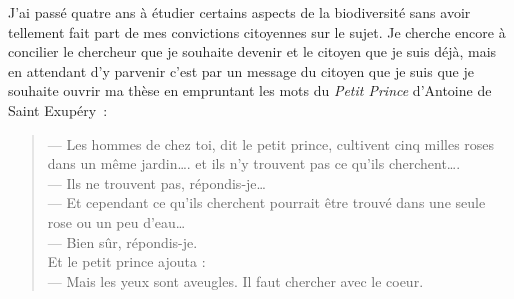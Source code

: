 J'ai passé quatre ans à étudier certains aspects de la biodiversité sans
avoir tellement fait part de mes convictions citoyennes sur le sujet. Je
cherche encore à concilier le chercheur que je souhaite devenir et le
citoyen que je suis déjà, mais en attendant d'y parvenir c'est par un
message du citoyen que je suis que je souhaite ouvrir ma thèse en
empruntant les mots du \textit{Petit Prince} d'Antoine de Saint
Exupéry~:

\begin{quote}
--- Les hommes de chez toi, dit le petit prince, cultivent cinq milles
roses dans un même jardin\ldots{}. et ils n'y trouvent pas ce qu'ils
cherchent\ldots{}.\\
--- Ils ne trouvent pas, répondis-je\ldots{}\\
--- Et cependant ce qu'ils cherchent pourrait être trouvé dans une seule
rose ou un peu d'eau\ldots{}\\
--- Bien sûr, répondis-je.\\
Et le petit prince ajouta :\\
--- Mais les yeux sont aveugles. Il faut chercher avec le coeur.
\end{quote}
